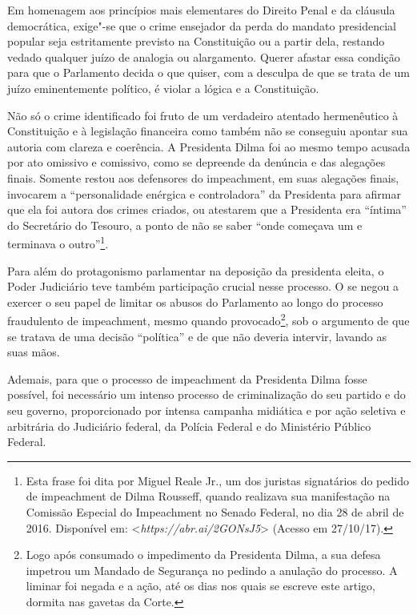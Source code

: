 Em homenagem aos princípios mais elementares do Direito Penal e da
cláusula democrática, exige"-se que o crime ensejador da perda do mandato
presidencial popular seja estritamente previsto na Constituição ou a
partir dela, restando vedado qualquer juízo de analogia ou alargamento.
Querer afastar essa condição para que o Parlamento decida o que quiser,
com a desculpa de que se trata de um juízo eminentemente político, é
violar a lógica e a Constituição.

Não só o crime identificado foi fruto de um verdadeiro atentado
hermenêutico à Constituição e à legislação financeira como também não se
conseguiu apontar sua autoria com clareza e coerência. A Presidenta
Dilma foi ao mesmo tempo acusada por ato omissivo e comissivo, como se
depreende da denúncia e das alegações finais. Somente restou aos
defensores do impeachment, em suas alegações finais, invocarem a
``personalidade enérgica e controladora'' da Presidenta para afirmar que
ela foi autora dos crimes criados, ou atestarem que a Presidenta era
``íntima'' do Secretário do Tesouro, a ponto de não se saber ``onde
começava um e terminava o outro''\footnote{Esta frase foi dita por Miguel
  Reale Jr., um dos juristas signatários do pedido de impeachment de
  Dilma Rousseff, quando realizava sua manifestação na Comissão Especial
  do Impeachment no Senado Federal, no dia 28 de abril de 2016.
  Disponível em:
  \textless{}\emph{https://abr.ai/2GONsJ5}\textgreater{}
  (Acesso em 27/10/17).}.

Para além do protagonismo parlamentar na deposição da presidenta eleita,
o Poder Judiciário teve também participação crucial nesse processo. O
 se negou a exercer o seu papel de limitar os abusos do Parlamento ao
longo do processo fraudulento de impeachment, mesmo quando
provocado\footnote{Logo após consumado o impedimento da Presidenta
  Dilma, a sua defesa impetrou um Mandado de Segurança no  pedindo a
  anulação do processo. A liminar foi negada e a ação, até os dias
  nos quais se escreve este artigo, dormita nas gavetas da Corte.}, sob
o argumento de que se tratava de uma decisão ``política'' e de que não
deveria intervir, lavando as suas mãos.

Ademais, para que o processo de impeachment da Presidenta Dilma fosse
possível, foi necessário um intenso processo de criminalização do seu
partido e do seu governo, proporcionado por intensa campanha midiática e
por ação seletiva e arbitrária do Judiciário federal, da Polícia Federal
e do Ministério Público Federal.

